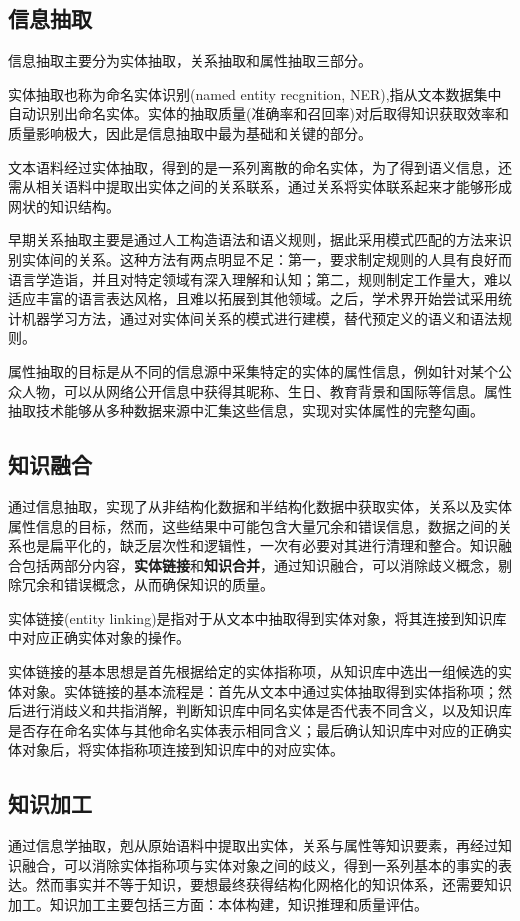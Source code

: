 \documentclass[11pt]{article}
\begin{document}
	\subsection{信息抽取}
	信息抽取主要分为实体抽取，关系抽取和属性抽取三部分。
	
	实体抽取也称为命名实体识别(named entity recgnition, NER),指从文本数据集中自动识别出命名实体。实体的抽取质量(准确率和召回率)对后取得知识获取效率和质量影响极大，因此是信息抽取中最为基础和关键的部分。
	
	文本语料经过实体抽取，得到的是一系列离散的命名实体，为了得到语义信息，还需从相关语料中提取出实体之间的关系联系，通过关系将实体联系起来才能够形成网状的知识结构。
	
	早期关系抽取主要是通过人工构造语法和语义规则，据此采用模式匹配的方法来识别实体间的关系。这种方法有两点明显不足：第一，要求制定规则的人具有良好而语言学造诣，并且对特定领域有深入理解和认知；第二，规则制定工作量大，难以适应丰富的语言表达风格，且难以拓展到其他领域。之后，学术界开始尝试采用统计机器学习方法，通过对实体间关系的模式进行建模，替代预定义的语义和语法规则。
	
	属性抽取的目标是从不同的信息源中采集特定的实体的属性信息，例如针对某个公众人物，可以从网络公开信息中获得其昵称、生日、教育背景和国际等信息。属性抽取技术能够从多种数据来源中汇集这些信息，实现对实体属性的完整勾画。
	
	\subsection{知识融合}
	通过信息抽取，实现了从非结构化数据和半结构化数据中获取实体，关系以及实体属性信息的目标，然而，这些结果中可能包含大量冗余和错误信息，数据之间的关系也是扁平化的，缺乏层次性和逻辑性，一次有必要对其进行清理和整合。知识融合包括两部分内容，\textbf{实体链接}和\textbf{知识合并}，通过知识融合，可以消除歧义概念，剔除冗余和错误概念，从而确保知识的质量。
	
	实体链接(entity linking)是指对于从文本中抽取得到实体对象，将其连接到知识库中对应正确实体对象的操作。
	
	实体链接的基本思想是首先根据给定的实体指称项，从知识库中选出一组候选的实体对象。实体链接的基本流程是：首先从文本中通过实体抽取得到实体指称项；然后进行消歧义和共指消解，判断知识库中同名实体是否代表不同含义，以及知识库是否存在命名实体与其他命名实体表示相同含义；最后确认知识库中对应的正确实体对象后，将实体指称项连接到知识库中的对应实体。
	
	\subsection{知识加工}
	通过信息学抽取，剋从原始语料中提取出实体，关系与属性等知识要素，再经过知识融合，可以消除实体指称项与实体对象之间的歧义，得到一系列基本的事实的表达。然而事实并不等于知识，要想最终获得结构化网格化的知识体系，还需要知识加工。知识加工主要包括三方面：本体构建，知识推理和质量评估。
	
\end{document}
